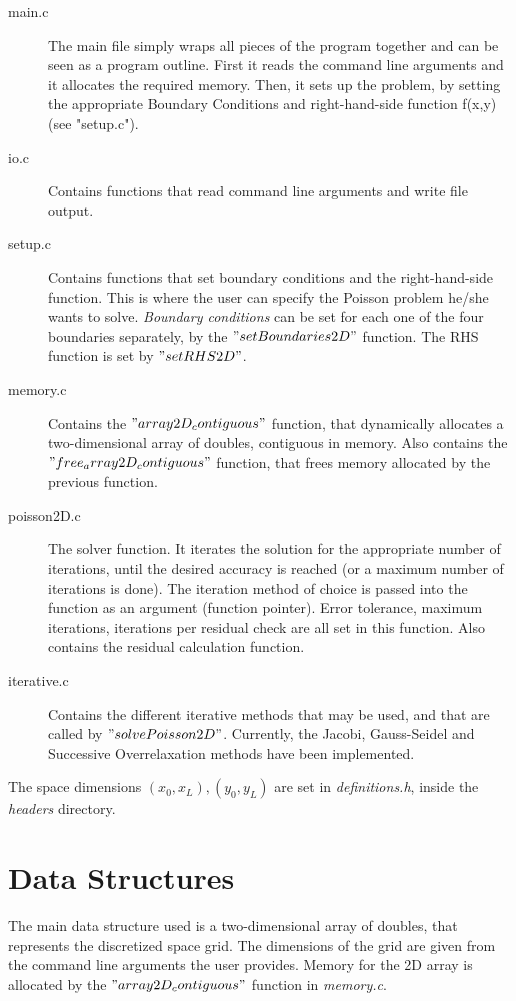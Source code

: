 \documentclass[11pt]{report}
\begin{document}
\begin{description}
  \item[main.c] The main file simply wraps all pieces of the program together and can be seen as a program outline. First it reads the command line arguments and it allocates the required memory. Then, it sets up the problem, by setting the appropriate Boundary Conditions and right-hand-side function f(x,y) (see "setup.c").
  \item[io.c] Contains functions that read command line arguments and write file output.
  \item[setup.c] Contains functions that set boundary conditions and the right-hand-side function. This is where the user can specify the Poisson problem he/she wants to solve. \emph{Boundary conditions} can be set for each one of the four boundaries separately, by the $"setBoundaries2D"$ function. The RHS function is set by $"setRHS2D"$.
  \item[memory.c] Contains the $"array2D_contiguous"$ function, that dynamically allocates a two-dimensional array of doubles, contiguous in memory. Also contains the $"free_array2D_contiguous"$ function, that frees memory allocated by the previous function.
  \item[poisson2D.c] The solver function. It iterates the solution for the appropriate number of iterations, until the desired accuracy is reached (or a maximum number of iterations is done). The iteration method of choice is passed into the function as an argument (function pointer). Error tolerance, maximum iterations, iterations per residual check are all set in this function. Also contains the residual calculation function.
  \item[iterative.c] Contains the different iterative methods that may be used, and that are called by $"solvePoisson2D"$. Currently, the Jacobi, Gauss-Seidel and Successive Overrelaxation methods have been implemented.
\end{description}

The space dimensions $(x_0, x_L), (y_0, y_L)$ are set in \emph{definitions.h}, inside the \emph{headers} directory.

\section{Data Structures}
The main data structure used is a two-dimensional array of doubles, that represents the discretized space grid. The dimensions of the grid are given from the command line arguments the user provides. Memory for the 2D array is allocated by the $"array2D_contiguous"$ function in \emph{memory.c}.
\newline
\end{document}

